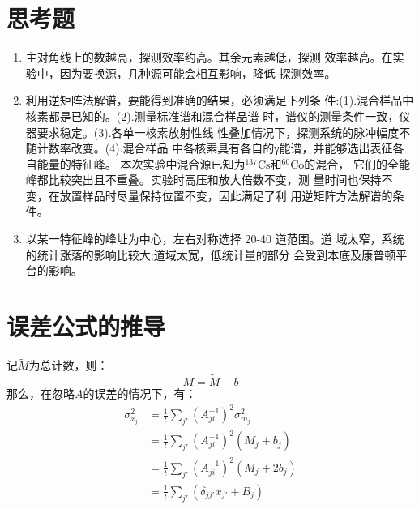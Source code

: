 \documentclass{article}
\begin{document}
    \section{思考题}
    \begin{enumerate}
        \item 主对角线上的数越高，探测效率约高。其余元素越低，探测
        效率越高。在实验中，因为要换源，几种源可能会相互影响，降低 探测效率。
        \item 利用逆矩阵法解谱，要能得到准确的结果，必须满足下列条
        件:(1).混合样品中核素都是已知的。(2).测量标准谱和混合样品谱 时，谱仪的测量条件一致，仪器要求稳定。(3).各单一核素放射性线 性叠加情况下，探测系统的脉冲幅度不随计数率改变。(4).混合样品 中各核素具有各自的γ能谱，并能够选出表征各自能量的特征峰。
        本次实验中混合源已知为$^{137}\text{Cs}$和$^{60}\text{Co}$的混合， 它们的全能峰都比较突出且不重叠。实验时高压和放大倍数不变，测 量时间也保持不变，在放置样品时尽量保持位置不变，因此满足了利 用逆矩阵方法解谱的条件。
        \item 以某一特征峰的峰址为中心，左右对称选择 20-40 道范围。道 域太窄，系统的统计涨落的影响比较大;道域太宽，低统计量的部分 会受到本底及康普顿平台的影响。
    \end{enumerate}
    \section{误差公式的推导}
    记$\tilde{M}$为总计数，则：
    \begin{equation}
        M = \tilde{M} - b
    \end{equation}
    那么，在忽略$A$的误差的情况下，有：
    \begin{equation}
        \begin{aligned}
            \sigma_{x_j}^2 &= \frac{1}{t}\sum_{j'}(A^{-1}_{ji})^2\sigma_{m_j}^2\\
            &=  \frac{1}{t}\sum_{j'} (A_{ji}^{-1})^2({\tilde{M}_j}+b_j)\\
            &=  \frac{1}{t}\sum_{j'} (A_{ji}^{-1})^2({{M}_j}+2b_j) \\
            &=\frac{1}{t}\sum_{j'}(\delta_{jj'}x_{j'} + B_j)
        \end{aligned}
    \end{equation}
\end{document}
